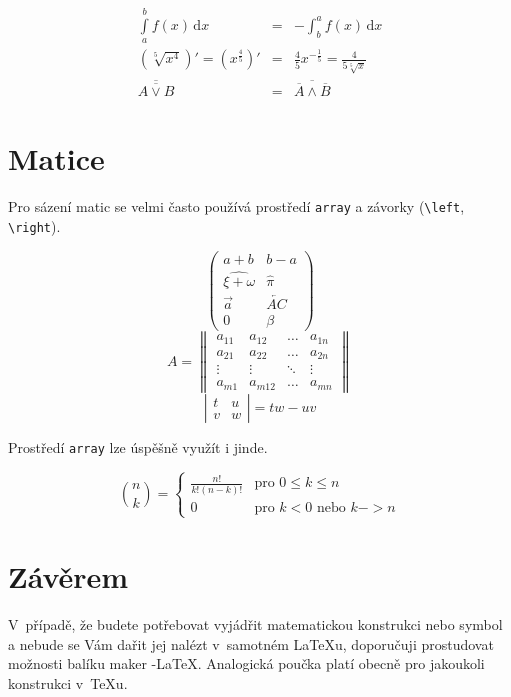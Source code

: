 \documentclass[a4paper, 11pt]{article}
\theoremstyle{plain}
\theoremstyle{definition}
\theoremstyle{plain}
\begin{document}
\begin{eqnarray}
\int\limits_a^b f(x)\,\mathrm{d}x & = & - \int_b^a f(x)\,\mathrm{d}x \\
\left(\sqrt[5]{x^4} \right)' = \left(x^{\frac{4}{5}}\right)' & = & \frac{4}{5}x^{-\frac{1}{5}} = \frac{4}{5\sqrt[5]{x}} \\
\overline{\overline{A \vee B}} & = & \overline{\overline{A} \wedge \overline{B}}
\end{eqnarray}

\section{Matice}

Pro sázení matic se velmi často používá prostředí \verb|array| a závorky (\verb|\left|, \verb|\right|).

\begin{center}
$$
\left( \begin{array}{cc}
  a+b & b-a \\
  \widehat{\xi+\omega} & \hat{\pi} \\
  \vec{a} & \overleftarrow{AC} \\
  0 & \beta
\end{array} \right)
$$$$
A = \left \| \begin{array}{cccc}
  a_{11} & a_{12} & \ldots & a_{1n} \\
  a_{21} & a_{22} & \ldots & a_{2n} \\
  \vdots & \vdots & \ddots & \vdots \\
  a_{m1} & a_{m12} & \ldots & a_{mn}
\end{array} \right \|
$$$$
\left| \begin{array}{cc}
  t & u \\
  v & w
\end{array} \right|
= tw - uv
$$
\end{center}

Prostředí \verb|array| lze úspěšně využít i jinde.

$$
\binom{n}{k} = \left \{ \begin{array}{ll}
  \frac{n!}{k!(n-k)!} & \text{pro } 0 \leq k \leq n \\
  0 & \text{pro } k < 0 \text{ nebo } k-> n
\end{array} \right.
$$

\section{Závěrem}

V~případě, že budete potřebovat vyjádřit matematickou konstrukci nebo symbol a nebude se Vám dařit jej nalézt v~samotném {\LaTeX}u, doporučuji prostudovat možnosti balíku maker \AmS-\LaTeX.
Analogická poučka platí obecně pro jakoukoli konstrukci v~{\TeX}u.
\end{document}
